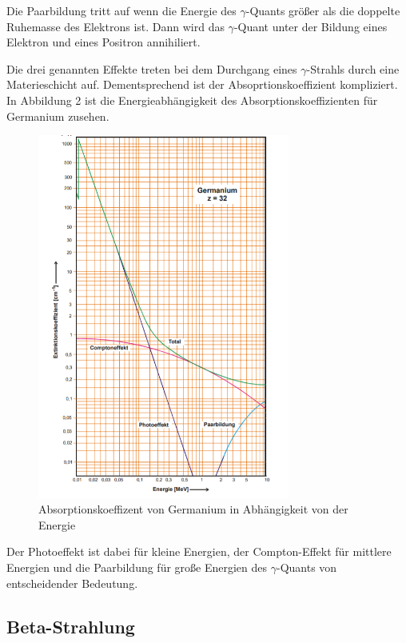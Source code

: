 Die Paarbildung tritt auf wenn die Energie des $\gamma$-Quants größer als die doppelte Ruhemasse des Elektrons ist. Dann
wird das $\gamma$-Quant unter der Bildung eines Elektron und eines Positron annihiliert.

Die drei genannten Effekte treten bei dem Durchgang eines $\gamma$-Strahls durch eine Materieschicht auf. Dementsprechend ist
der Absoprtionskoeffizient kompliziert. In Abbildung 2 ist die Energieabhängigkeit des Absorptionskoeffizienten für Germanium zusehen.

\begin{figure}[H]
  \centering
  \includegraphics[height=12cm]{absorptionskoeffizient.PNG}
  \caption{Absorptionskoeffizent von Germanium in Abhängigkeit von der Energie \cite{sample}}
  \label{fig:Linienspektrum}
\end{figure}

Der Photoeffekt ist dabei für kleine Energien, der Compton-Effekt für mittlere Energien und die Paarbildung für
große Energien des $\gamma$-Quants von entscheidender Bedeutung.


\subsection{Beta-Strahlung}

